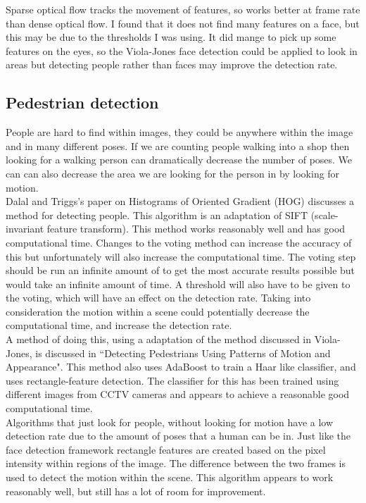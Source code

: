\documentclass[10pt,a4paper,openbib]{article}
\begin{document}
\begin{multicols}{2}
\noindent Sparse optical flow tracks the movement of features, so works better at frame rate than dense optical flow. I found that it does not find many features on a face, but this may be due to the thresholds I was using. It did mange to pick up some features on the eyes, so the Viola-Jones\cite{violaJones} face detection could be applied to look in areas but detecting people rather than faces may improve the detection rate.\\ 

\subsection{Pedestrian detection}
People are hard to find within images, they could be anywhere within the image and in many different poses. If we are counting people walking into a shop then looking for a walking person can dramatically decrease the number of poses. We can can also decrease the area we are looking for the person in by looking for motion.\\

\noindent Dalal and Triggs's  paper\cite{dalalTriggs} on Histograms of Oriented Gradient (HOG) discusses a method for detecting people. This algorithm is an adaptation of SIFT (scale-invariant feature transform). This method works reasonably well and has good computational time. Changes to the voting method can increase the accuracy of this but unfortunately will also increase the computational time. The voting step should be run an infinite amount of to get the most accurate results possible but would take an infinite amount of time. A threshold will also have to be given to the voting, which will have an effect on the detection rate. Taking into consideration the motion within a scene could potentially decrease the computational time, and increase the detection rate\cite{dalalTriggs}. \\

\noindent A method of doing this, using a adaptation of the method discussed in Viola-Jones\cite{violaJones}, is discussed in ``Detecting Pedestrians Using Patterns of Motion and Appearance"\cite{violaJonesSnow}. This method also uses AdaBoost to train a Haar like classifier, and uses rectangle-feature detection. The classifier for this has been trained using different images from CCTV cameras and appears to achieve a reasonable good computational time. \\

\noindent Algorithms that just look for people, without looking for motion have a low detection rate due to the amount of poses that a human can be in. Just like the face detection framework rectangle features are created based on the pixel intensity within regions of the image. The difference between the two frames is used to detect the motion within the scene. This algorithm appears to work reasonably well, but still has a lot of room for improvement. \cite{violaJonesSnow}


\end{multicols}
\end{document}
